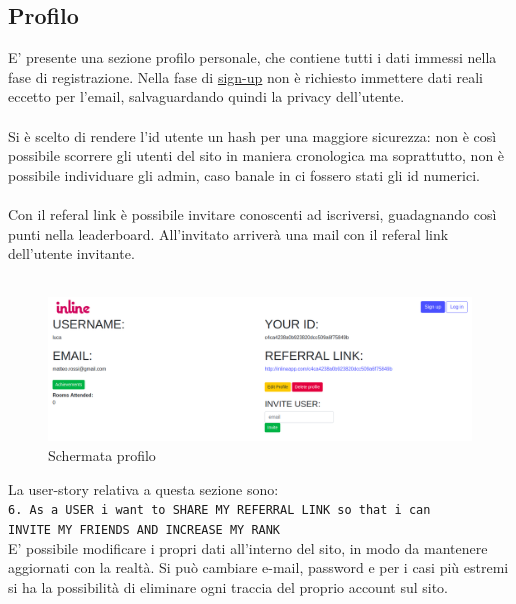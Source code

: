 	\subsection{Profilo}
	E' presente una sezione profilo personale, che contiene tutti i dati immessi nella fase di registrazione. Nella fase di \hyperref[sec:signup]{sign-up} non è richiesto immettere dati reali eccetto per l'email, salvaguardando quindi la privacy dell'utente.\\\\
	Si è scelto di rendere l'id utente un hash per una maggiore sicurezza: non è così possibile scorrere gli utenti del sito in maniera cronologica ma soprattutto, non è possibile individuare gli admin, caso banale in ci fossero stati gli id numerici.\\\\
	Con il referal link è possibile invitare conoscenti ad iscriversi, guadagnando così punti nella leaderboard. All'invitato arriverà una mail con il referal link dell'utente invitante.\\\\
	\begin{figure}[H]
		\includegraphics[width=\columnwidth]{./media/image14.png}
		\caption{Schermata profilo}
	\end{figure}
	La user-story relativa a questa sezione sono:\\
	\texttt{6. As a USER i want to SHARE MY REFERRAL LINK so that i can \\ INVITE MY FRIENDS AND INCREASE MY RANK}\\
		
	E' possibile modificare i propri dati all'interno del sito, in modo da mantenere aggiornati con la realtà. Si può cambiare e-mail, password e per i casi più estremi si ha la possibilità di eliminare ogni traccia del proprio account sul sito.
	
